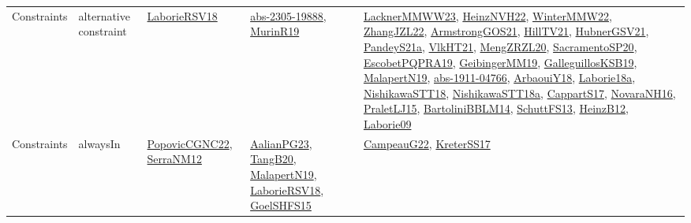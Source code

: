 {\begin{longtable}{lp{3cm}>{\raggedright}p{6cm}>{\raggedright}p{6cm}p{8cm}}
Constraints & alternative constraint & \href{articles/LaborieRSV18.pdf}{LaborieRSV18}\cite{LaborieRSV18} & \href{articles/abs-2305-19888.pdf}{abs-2305-19888}\cite{abs-2305-19888}, \href{papers/MurinR19.pdf}{MurinR19}\cite{MurinR19} & \href{articles/LacknerMMWW23.pdf}{LacknerMMWW23}\cite{LacknerMMWW23}, \href{articles/HeinzNVH22.pdf}{HeinzNVH22}\cite{HeinzNVH22}, \href{papers/WinterMMW22.pdf}{WinterMMW22}\cite{WinterMMW22}, \href{papers/ZhangJZL22.pdf}{ZhangJZL22}\cite{ZhangJZL22}, \href{papers/ArmstrongGOS21.pdf}{ArmstrongGOS21}\cite{ArmstrongGOS21}, \href{papers/HillTV21.pdf}{HillTV21}\cite{HillTV21}, \href{articles/HubnerGSV21.pdf}{HubnerGSV21}\cite{HubnerGSV21}, \href{articles/PandeyS21a.pdf}{PandeyS21a}\cite{PandeyS21a}, \href{articles/VlkHT21.pdf}{VlkHT21}\cite{VlkHT21}, \href{articles/MengZRZL20.pdf}{MengZRZL20}\cite{MengZRZL20}, \href{articles/SacramentoSP20.pdf}{SacramentoSP20}\cite{SacramentoSP20}, \href{articles/EscobetPQPRA19.pdf}{EscobetPQPRA19}\cite{EscobetPQPRA19}, \href{papers/GeibingerMM19.pdf}{GeibingerMM19}\cite{GeibingerMM19}, \href{papers/GalleguillosKSB19.pdf}{GalleguillosKSB19}\cite{GalleguillosKSB19}, \href{papers/MalapertN19.pdf}{MalapertN19}\cite{MalapertN19}, \href{articles/abs-1911-04766.pdf}{abs-1911-04766}\cite{abs-1911-04766}, \href{papers/ArbaouiY18.pdf}{ArbaouiY18}\cite{ArbaouiY18}, \href{papers/Laborie18a.pdf}{Laborie18a}\cite{Laborie18a}, \href{papers/NishikawaSTT18.pdf}{NishikawaSTT18}\cite{NishikawaSTT18}, \href{papers/NishikawaSTT18a.pdf}{NishikawaSTT18a}\cite{NishikawaSTT18a}, \href{papers/CappartS17.pdf}{CappartS17}\cite{CappartS17}, \href{articles/NovaraNH16.pdf}{NovaraNH16}\cite{NovaraNH16}, \href{papers/PraletLJ15.pdf}{PraletLJ15}\cite{PraletLJ15}, \href{papers/BartoliniBBLM14.pdf}{BartoliniBBLM14}\cite{BartoliniBBLM14}, \href{papers/SchuttFS13.pdf}{SchuttFS13}\cite{SchuttFS13}, \href{papers/HeinzB12.pdf}{HeinzB12}\cite{HeinzB12}, \href{papers/Laborie09.pdf}{Laborie09}\cite{Laborie09}\\
Constraints & alwaysIn & \href{papers/PopovicCGNC22.pdf}{PopovicCGNC22}\cite{PopovicCGNC22}, \href{papers/SerraNM12.pdf}{SerraNM12}\cite{SerraNM12} & \href{papers/AalianPG23.pdf}{AalianPG23}\cite{AalianPG23}, \href{papers/TangB20.pdf}{TangB20}\cite{TangB20}, \href{papers/MalapertN19.pdf}{MalapertN19}\cite{MalapertN19}, \href{articles/LaborieRSV18.pdf}{LaborieRSV18}\cite{LaborieRSV18}, \href{articles/GoelSHFS15.pdf}{GoelSHFS15}\cite{GoelSHFS15} & \href{articles/CampeauG22.pdf}{CampeauG22}\cite{CampeauG22}, \href{articles/KreterSS17.pdf}{KreterSS17}\cite{KreterSS17}\\

\end{longtable}}
